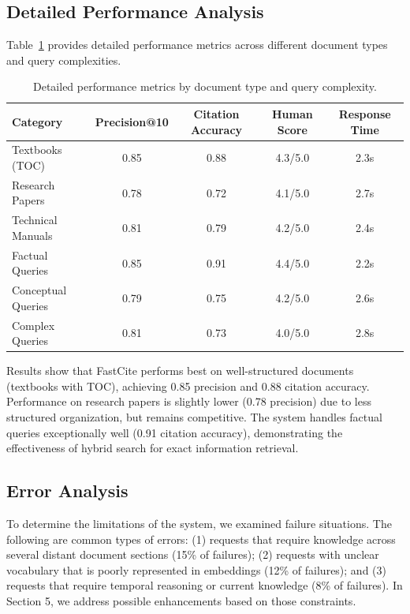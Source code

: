 \documentclass[runningheads]{llncs}
\begin{document}
\subsection{Detailed Performance Analysis}

Table~\ref{tab:detailed_metrics} provides detailed performance metrics across different document types and query complexities.

\begin{table}
\caption{Detailed performance metrics by document type and query complexity.}
\label{tab:detailed_metrics}
\begin{tabular}{|l|c|c|c|c|}
\hline
\textbf{Category} & \textbf{Precision@10} & \textbf{Citation Accuracy} & \textbf{Human Score} & \textbf{Response Time} \\
\hline
Textbooks (TOC) & 0.85 & 0.88 & 4.3/5.0 & 2.3s \\
Research Papers & 0.78 & 0.72 & 4.1/5.0 & 2.7s \\
Technical Manuals & 0.81 & 0.79 & 4.2/5.0 & 2.4s \\
\hline
Factual Queries & 0.85 & 0.91 & 4.4/5.0 & 2.2s \\
Conceptual Queries & 0.79 & 0.75 & 4.2/5.0 & 2.6s \\
Complex Queries & 0.81 & 0.73 & 4.0/5.0 & 2.8s \\
\hline
\end{tabular}
\end{table}

Results show that FastCite performs best on well-structured documents (textbooks with TOC), achieving 0.85 precision and 0.88 citation accuracy. Performance on research papers is slightly lower (0.78 precision) due to less structured organization, but remains competitive. The system handles factual queries exceptionally well (0.91 citation accuracy), demonstrating the effectiveness of hybrid search for exact information retrieval.

\subsection{Error Analysis}

To determine the limitations of the system, we examined failure situations. The following are common types of errors: (1) requests that require knowledge across several distant document sections (15\% of failures); (2) requests with unclear vocabulary that is poorly represented in embeddings (12\% of failures); and (3) requests that require temporal reasoning or current knowledge (8\% of failures). In Section 5, we address possible enhancements based on those constraints.
\end{document}
